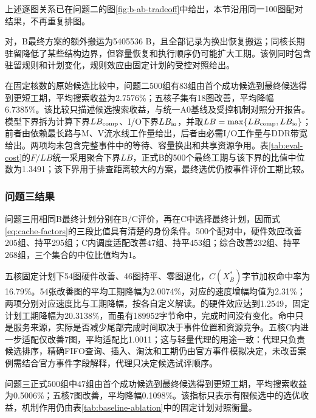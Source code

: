 上述逐图关系已在问题二的图\ref{fig:b-ab-tradeoff}中给出，本节沿用同一100图配对结果，不再重复排图。

对，B最终方案的额外搬运为5405536 B，且全部记录为换出恢复搬运；同核长期驻留降低了某些结构边界，但容量恢复和执行顺序仍可能扩大工期。该例同时包含驻留规则和计划变化，规则效应由固定计划的受控对照给出。

在固定核数的原始候选比较中，问题二500组有83组由首个成功候选到最终候选得到更短工期，平均搜索收益为2.7576\%；五核子集有18图改善，平均降幅6.7385\%。该比较只描述候选搜索收益，与统一A0基线及受控机制对照分开报告。模型下界拆为计算下界$LB_{\rm comp}$、I/O下界$LB_{\rm io}$，并取$LB=\max\{LB_{\rm comp},LB_{\rm io}\}$；前者由依赖最长路与M、V流水线工作量给出，后者由必需I/O工作量与DDR带宽给出。两项均未包含完整事件中的等待、容量换出和共享资源争用。表\ref{tab:eval-cost}的$F/LB$统一采用聚合下界$LB$，正式B的500个最终工期与该下界的比值中位数为1.3491；该下界用于排查距离较大的方案，最终选优仍按事件评价工期比较。

\subsubsection{问题三结果}
问题三用相同B最终计划分别在B/C评价，再在C中选择最终计划，因而式\eqref{eq:cache-factors}的三段比值具有清楚的身份条件。500个配对中，硬件效应改善205组、持平295组；C内调度适配改善47组、持平453组；综合改善232组、持平268组，三个集合的中位比值均为1。

五核固定计划下54图硬件改善、46图持平、零图退化，$C(X_B^*)$字节加权命中率为16.79\%。54张改善图的平均工期降幅为2.0074\%，对应的速度增幅均值为2.31\%；两项分别对应速度比与工期降幅，按各自定义解读。的硬件效应达到1.2549，固定计划工期降幅为20.3138\%，而虽有189952字节命中，完成时间没有变化。命中只是服务来源，实际是否减少尾部完成时间取决于事件位置和资源竞争。五核C内进一步适配仅改善7图，平均适配比1.0011；这与轻量代理的用途一致：代理只负责候选排序，精确FIFO查询、插入、淘汰和工期仍由官方事件模拟决定，未改善案例需结合官方事件字段解释，代理只决定候选试评顺序。

问题三正式500组中47组由首个成功候选到最终候选得到更短工期，平均搜索收益为0.5006\%；五核7图改善，平均降幅0.1098\%。该指标只表示有限候选中的选优收益，机制作用仍由表\ref{tab:baseline-ablation}中的固定计划对照衡量。

